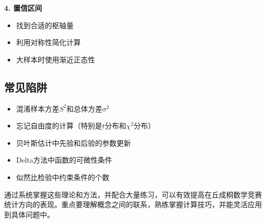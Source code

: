 \documentclass[12pt,a4paper]{article}
\theoremstyle{remark}
\begin{document}
\textbf{4. 置信区间}
\begin{itemize}
\item 找到合适的枢轴量
\item 利用对称性简化计算
\item 大样本时使用渐近正态性
\end{itemize}

\subsection{常见陷阱}

\begin{itemize}
\item 混淆样本方差$S^2$和总体方差$\sigma^2$
\item 忘记自由度的计算（特别是$t$分布和$\chi^2$分布）
\item 贝叶斯估计中先验和后验的参数更新
\item Delta方法中函数的可微性条件
\item 似然比检验中约束条件的个数
\end{itemize}

通过系统掌握这些理论和方法，并配合大量练习，可以有效提高在丘成桐数学竞赛统计方向的表现。重点要理解概念之间的联系，熟练掌握计算技巧，并能灵活应用到具体问题中。
\end{document}

